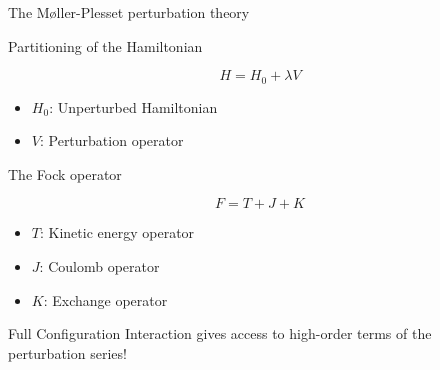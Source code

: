 \documentclass[xcolor=x11names,compress]{beamer}
\renewcommand{\(}{\begin{columns}}
\renewcommand{\)}{\end{columns}}
\newcommand{\<}[1]{\begin{column}{#1}}
\renewcommand{\>}{\end{column}}
\begin{document}
\begin{frame}{The Møller-Plesset perturbation theory}

\pause[1]

\begin{beamerboxesrounded}[scheme=foncé]{\centering Partitioning of the Hamiltonian}

\begin{equation}
   H = H_0 + \lambda V
\end{equation}

\end{beamerboxesrounded}

\begin{itemize}
\centering
    \item $H_0$: Unperturbed Hamiltonian
    \item $V$: Perturbation operator
\end{itemize}

\pause[2]

\begin{beamerboxesrounded}[scheme=foncé]{\centering The Fock operator}

\begin{equation}
   F = T + J + K
\end{equation}

\end{beamerboxesrounded}

\begin{itemize}
\centering
    \item $T$: Kinetic energy operator
    \item $J$: Coulomb operator
    \item $K$: Exchange operator
\end{itemize}

\pause[3]

\begin{beamerboxesrounded}[scheme=foncé]{}
\centering

Full Configuration Interaction gives access to high-order terms of the perturbation series!

\end{beamerboxesrounded}
    
\end{frame}
\end{document}
